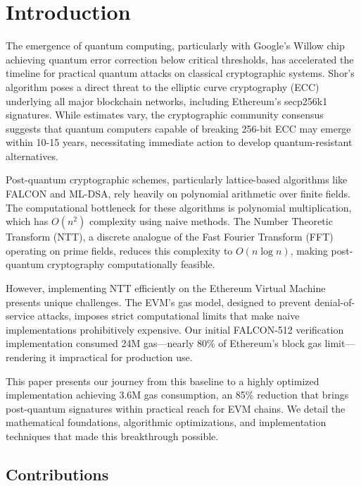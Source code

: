 \section{Introduction}


The emergence of quantum computing, particularly with Google's Willow chip achieving quantum error correction below critical thresholds, has accelerated the timeline for practical quantum attacks on classical cryptographic systems. Shor's algorithm poses a direct threat to the elliptic curve cryptography (ECC) underlying all major blockchain networks, including Ethereum's secp256k1 signatures. While estimates vary, the cryptographic community consensus suggests that quantum computers capable of breaking 256-bit ECC may emerge within 10-15 years, necessitating immediate action to develop quantum-resistant alternatives.

Post-quantum cryptographic schemes, particularly lattice-based algorithms like FALCON and ML-DSA, rely heavily on polynomial arithmetic over finite fields. The computational bottleneck for these algorithms is polynomial multiplication, which has $O(n^2)$ complexity using naive methods. The Number Theoretic Transform (NTT), a discrete analogue of the Fast Fourier Transform (FFT) operating on prime fields, reduces this complexity to $O(n \log n)$, making post-quantum cryptography computationally feasible.

However, implementing NTT efficiently on the Ethereum Virtual Machine presents unique challenges. The EVM's gas model, designed to prevent denial-of-service attacks, imposes strict computational limits that make naive implementations prohibitively expensive. Our initial FALCON-512 verification implementation consumed 24M gas---nearly 80\% of Ethereum's block gas limit---rendering it impractical for production use.

This paper presents our journey from this baseline to a highly optimized implementation achieving 3.6M gas consumption, an 85\% reduction that brings post-quantum signatures within practical reach for EVM chains. We detail the mathematical foundations, algorithmic optimizations, and implementation techniques that made this breakthrough possible.

\subsection{Contributions}

